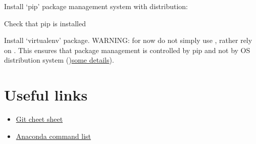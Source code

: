 \documentclass[12pt]{article}
\begin{document}
Install `pip' package management system with distribution:

Check that pip is installed

Install `virtualenv' package. WARNING: for now do not simply use , rather rely on . This ensures that package management is controlled by pip and not by OS distribution system ()\href{https://github.com/pypa/pip/issues/5599}{some details}).





\section{Useful links}

\begin{itemize}
\item\href{https://github.github.com/training-kit/downloads/github-git-cheat-sheet.pdf}{Git cheet sheet}
\item\href{https://docs.conda.io/projects/conda/en/4.6.0/commands.html}{Anaconda command list}
\end{itemize}
\end{document}
